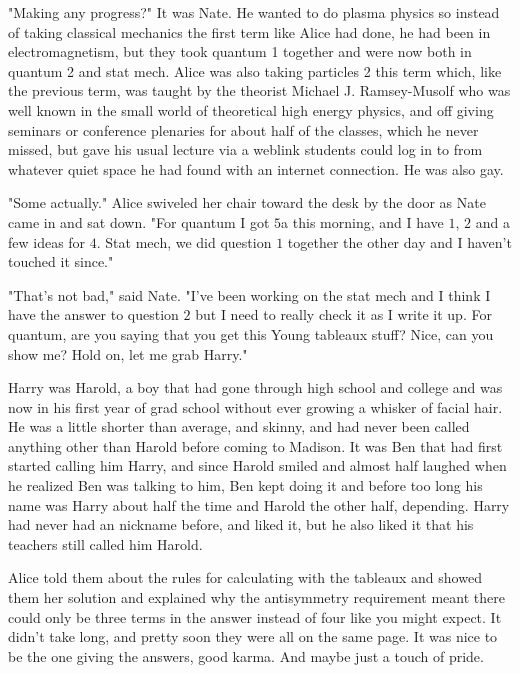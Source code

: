 \mypause

"Making any progress?" It was Nate. He wanted to do plasma physics so instead of taking classical mechanics the first term like Alice had done, he had been in electromagnetism, but they took quantum 1 together and were now both in quantum 2 and stat mech. Alice was also taking particles 2 this term which, like the previous term, was taught by the theorist Michael J. Ramsey-Musolf who was well known in the small world of theoretical high energy physics, and off giving seminars or conference plenaries for about half of the classes, which he never missed, but gave his usual lecture via a weblink students could log in to from whatever quiet space he had found with an internet connection. He was also gay. 

"Some actually." Alice swiveled her chair toward the desk by the door as Nate came in and sat down. "For quantum I got $5$a this morning, and I have $1$, $2$ and a few ideas for $4$. Stat mech, we did question $1$ together the other day and I haven't touched it since." 

"That's not bad," said Nate. "I've been working on the stat mech and I think I have the answer to question $2$ but I need to really check it as I write it up. For quantum, are you saying that you get this Young tableaux stuff? Nice, can you show me? Hold on, let me grab Harry." 

Harry was Harold, a boy that had gone through high school and college and was now in his first year of grad school without ever growing a whisker of facial hair. He was a little shorter than average, and skinny, and had never been called anything other than Harold before coming to Madison. It was Ben that had first started calling him Harry, and since Harold smiled and almost half laughed when he realized Ben was talking to him, Ben kept doing it and before too long his name was Harry about half the time and Harold the other half, depending. Harry had never had an nickname before, and liked it, but he also liked it that his teachers still called him Harold. 

\mypause

Alice told them about the rules for calculating with the tableaux and showed them her solution and explained why the antisymmetry requirement meant there could only be three terms in the answer instead of four like you might expect. It didn't take long, and pretty soon they were all on the same page. It was nice to be the one giving the answers, good karma. And maybe just a touch of pride.

